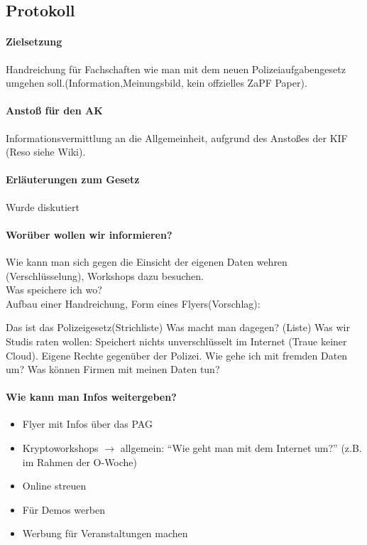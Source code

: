   \subsection*{Protokoll}
    \paragraph{Zielsetzung}
      Handreichung für Fachschaften wie man mit dem neuen Polizeiaufgabengesetz umgehen soll.(Information,Meinungsbild, kein offzielles ZaPF Paper).

    \paragraph{Anstoß für den AK}
      Informationsvermittlung an die Allgemeinheit, aufgrund des Anstoßes der KIF (Reso siehe Wiki).

    \paragraph{Erläuterungen zum Gesetz}
      Wurde diskutiert

    \paragraph{Worüber wollen wir informieren?}
      Wie kann man sich gegen die Einsicht der eigenen Daten wehren (Verschlüsselung), Workshops dazu besuchen. \\
      Was speichere ich wo? \\

      Aufbau einer Handreichung, Form eines Flyers(Vorschlag):
      \begin{outline}
        \1 Das ist das Polizeigesetz(Strichliste)
        \1 Was macht man dagegen? (Liste)
        \1 Was wir Studis raten wollen:
          \2 Speichert nichts unverschlüsselt im Internet (Traue keiner Cloud).
          \2 Eigene Rechte gegenüber der Polizei.
          \2 Wie gehe ich mit fremden Daten um?
          \2 Was können Firmen mit meinen Daten tun?
      \end{outline}

    \paragraph{Wie kann man Infos weitergeben?}
      \begin{itemize}
        \item Flyer mit Infos über das PAG
        \item Kryptoworkshops $\rightarrow$ allgemein: ``Wie geht man mit dem Internet um?''  (z.B. im Rahmen der O-Woche)
        \item Online streuen
        \item Für Demos werben
        \item Werbung für Veranstaltungen machen
      \end{itemize}
